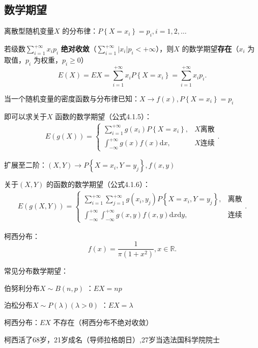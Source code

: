 \subsection{数学期望}%
\label{sub:数学期望}
\begin{defi}
    离散型随机变量$X$ 的分布律：$P\left\{ X=x_i \right\} =p_i,i=1,2,\ldots$ 

    若级数$\displaystyle{\sum_{i=1}^{+\infty} x_ip_i}$ \textbf{绝对收敛}（$\displaystyle{\sum_{i=1}^{+\infty} \left| x_i \right| p_i<+\infty}$），则$X$ 的数学期望\textbf{存在}（$x_i$ 为取值，$p_i$ 为权重，$p_i\ge 0$）
    \[
        E\left( X \right) =EX=\sum_{i=1}^{+\infty} x_iP\left\{ X=x_i \right\} =\sum_{i=1}^{+\infty} x_ip_i
    .\] 
\end{defi}
\begin{rrule}
    当一个随机变量的密度函数与分布律已知：$X\to f\left( x \right),P\left\{ X=x_i \right\} =p_i $

    即可以求关于$X$ 函数的数学期望（公式4.1.5）：
    \begin{align*}
        E\left( g\left( X \right)  \right) =\begin{cases}
            \displaystyle{\sum_{i=1}^{+\infty} g\left( x_i \right) P\left\{ X=x_i \right\} },&X\text{离散}\\
            \displaystyle{\int_{-\infty}^{+\infty} g\left( x \right) f\left( x \right)  \mathrm{d}x},&X\text{连续}
        \end{cases}
    .\end{align*}
\end{rrule}
\begin{rrule}
    扩展至二阶：$\left( X,Y \right) \to P\left\{ X=x_{i},Y=y_{j} \right\} ,f\left( x,y \right) $ 

    关于$\left( X,Y \right) $ 的函数的数学期望（公式4.1.6）：
    \begin{align*}
        E\left( g\left( X,Y \right)  \right) =\begin{cases}
            \displaystyle{\sum_{i=1}^{+\infty}{\sum_{j=1}^{+\infty} g\left( x_{i},y_{j} \right) P\left\{ X=x_{i},Y=y_{j} \right\}} },&\text{离散}\\
            \displaystyle{\int_{-\infty}^{+\infty}{\int_{-\infty}^{+\infty} g\left( x,y \right) f\left( x,y \right)  \mathrm{d}x} \mathrm{d}y},&\text{连续}
        \end{cases}
    .\end{align*}
\end{rrule}
\begin{notation}
    柯西分布：\[
        f\left( x \right) =\frac{1}{\pi\left( 1+x^2 \right) },x\in \mathbb{R}
    .\] 
\end{notation}
常见分布数学期望：
\begin{notation}
    伯努利分布$X\sim B\left( n,p \right) $ ：$EX=np$ 

    泊松分布$X\sim P\left( \lambda \right) \left( \lambda>0 \right) $ ：$EX=\lambda$ 

    柯西分布：$EX$ 不存在（柯西分布不绝对收敛）
\end{notation}
\begin{notation}
    柯西活了68岁，21岁成名（导师拉格朗日）,27岁当选法国科学院院士
\end{notation}



